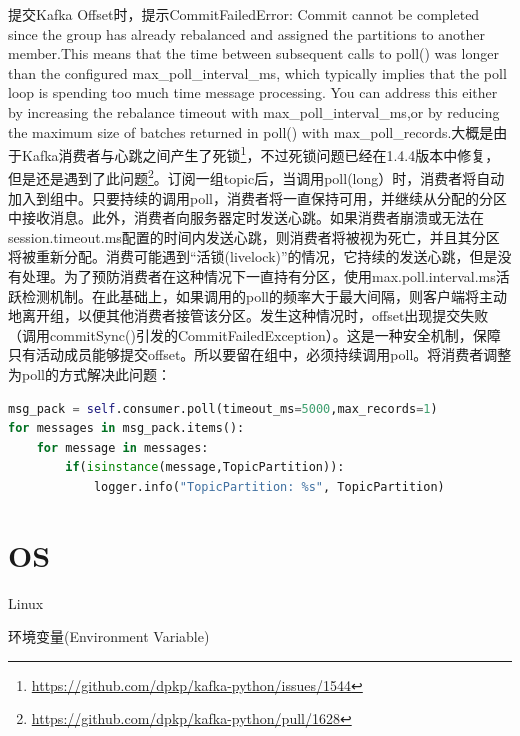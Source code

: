 \documentclass[8pt]{book}
\makeatletter
\numberwithin{dummy}{section}
\theoremstyle{ocrenumbox}
\theoremstyle{blacknumex}
\theoremstyle{blacknumbox}
\theoremstyle{ocrenum}
\renewcommand{\section}{\@startsection{section}{1}{\z@}
	{-4ex \@plus -1ex \@minus -.4ex}
	{1ex \@plus.2ex }
	{\normalfont\large\sffamily\bfseries}}
\renewcommand{\subsection}{\@startsection {subsection}{2}{\z@}
	{-3ex \@plus -0.1ex \@minus -.4ex}
	{0.5ex \@plus.2ex }
	{\normalfont\sffamily\bfseries}}
\makeatother
\begin{document}
提交Kafka Offset时，提示CommitFailedError: Commit cannot be completed since the group has already rebalanced and assigned the partitions to another member.This means that the time between subsequent calls to poll() was longer than the configured max\_poll\_interval\_ms, which typically implies that the poll loop is spending too much time message processing. You can address this either by increasing the rebalance timeout with max\_poll\_interval\_ms,or by reducing the maximum size of batches returned in poll() with max\_poll\_records.大概是由于Kafka消费者与心跳之间产生了死锁\footnote{\url{https://github.com/dpkp/kafka-python/issues/1544}}，不过死锁问题已经在1.4.4版本中修复，但是还是遇到了此问题\footnote{\url{https://github.com/dpkp/kafka-python/pull/1628}}。订阅一组topic后，当调用poll(long）时，消费者将自动加入到组中。只要持续的调用poll，消费者将一直保持可用，并继续从分配的分区中接收消息。此外，消费者向服务器定时发送心跳。如果消费者崩溃或无法在session.timeout.ms配置的时间内发送心跳，则消费者将被视为死亡，并且其分区将被重新分配。消费可能遇到“活锁(livelock)”的情况，它持续的发送心跳，但是没有处理。为了预防消费者在这种情况下一直持有分区，使用max.poll.interval.ms活跃检测机制。在此基础上，如果调用的poll的频率大于最大间隔，则客户端将主动地离开组，以便其他消费者接管该分区。发生这种情况时，offset出现提交失败（调用commitSync()引发的CommitFailedException）。这是一种安全机制，保障只有活动成员能够提交offset。所以要留在组中，必须持续调用poll。将消费者调整为poll的方式解决此问题：

\begin{lstlisting}[language=Python]
msg_pack = self.consumer.poll(timeout_ms=5000,max_records=1)
for messages in msg_pack.items():
    for message in messages:
        if(isinstance(message,TopicPartition)):
            logger.info("TopicPartition: %s", TopicPartition)
\end{lstlisting}

\chapter{OS}

\section{Linux}

\subsection{环境变量(Environment Variable)}
\end{document}
